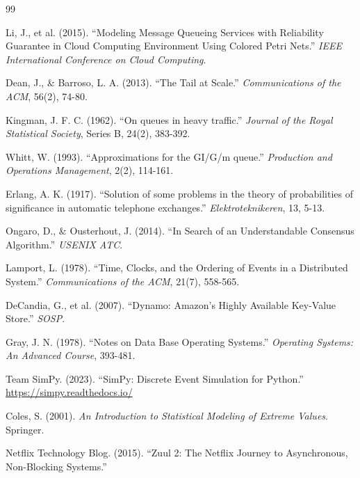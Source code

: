 \documentclass[11pt,a4paper]{article}
\begin{document}
\begin{thebibliography}{99}

 Li, J., et al. (2015). ``Modeling Message Queueing Services with Reliability Guarantee in Cloud Computing Environment Using Colored Petri Nets.'' \textit{IEEE International Conference on Cloud Computing}.

 Dean, J., \& Barroso, L. A. (2013). ``The Tail at Scale.'' \textit{Communications of the ACM}, 56(2), 74-80.

 Kingman, J. F. C. (1962). ``On queues in heavy traffic.'' \textit{Journal of the Royal Statistical Society}, Series B, 24(2), 383-392.

 Whitt, W. (1993). ``Approximations for the GI/G/m queue.'' \textit{Production and Operations Management}, 2(2), 114-161.

 Erlang, A. K. (1917). ``Solution of some problems in the theory of probabilities of significance in automatic telephone exchanges.'' \textit{Elektroteknikeren}, 13, 5-13.

 Ongaro, D., \& Ousterhout, J. (2014). ``In Search of an Understandable Consensus Algorithm.'' \textit{USENIX ATC}.

 Lamport, L. (1978). ``Time, Clocks, and the Ordering of Events in a Distributed System.'' \textit{Communications of the ACM}, 21(7), 558-565.

 DeCandia, G., et al. (2007). ``Dynamo: Amazon's Highly Available Key-Value Store.'' \textit{SOSP}.

 Gray, J. N. (1978). ``Notes on Data Base Operating Systems.'' \textit{Operating Systems: An Advanced Course}, 393-481.

 Team SimPy. (2023). ``SimPy: Discrete Event Simulation for Python.'' \url{https://simpy.readthedocs.io/}

 Coles, S. (2001). \textit{An Introduction to Statistical Modeling of Extreme Values}. Springer.

 Netflix Technology Blog. (2015). ``Zuul 2: The Netflix Journey to Asynchronous, Non-Blocking Systems.''

\end{thebibliography}
\end{document}
